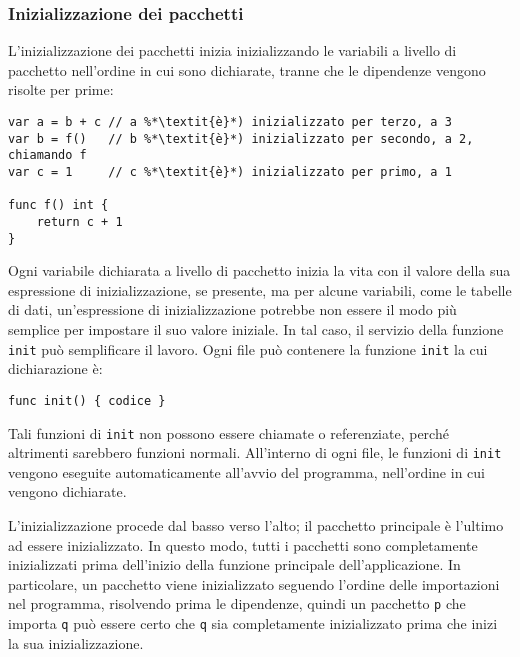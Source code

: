 \documentclass[../../../thesis.tex]{subfiles}
\begin{document}
    \subsubsection{Inizializzazione dei pacchetti}
    L'inizializzazione dei pacchetti inizia inizializzando le variabili a livello di pacchetto nell'ordine in cui sono dichiarate, tranne che le dipendenze vengono risolte per prime:
    \begin{lstlisting}[frame = single, label = {lst:lstlisting1-5-1.1}]
var a = b + c // a %*\textit{è}*) inizializzato per terzo, a 3
var b = f()   // b %*\textit{è}*) inizializzato per secondo, a 2, chiamando f
var c = 1     // c %*\textit{è}*) inizializzato per primo, a 1

func f() int {
    return c + 1
}
    \end{lstlisting}
    Ogni variabile dichiarata a livello di pacchetto inizia la vita con il valore della sua espressione di inizializzazione, se presente, ma per alcune variabili, come le tabelle di dati, un'espressione di inizializzazione potrebbe non essere il modo più semplice per impostare il suo valore iniziale.
    In tal caso, il servizio della funzione \verb"init" può semplificare il lavoro.
    Ogni file può contenere la funzione \verb"init" la cui dichiarazione è:
    \begin{lstlisting}[label = {lst:lstlisting1-5-1.2}]
func init() { codice }
    \end{lstlisting}
    Tali funzioni di \verb"init" non possono essere chiamate o referenziate, perché altrimenti sarebbero funzioni normali.
    All'interno di ogni file, le funzioni di \verb"init" vengono eseguite automaticamente all'avvio del programma, nell'ordine in cui vengono dichiarate.
    \hfill \vspace{12pt}

    L'inizializzazione procede dal basso verso l'alto;
    il pacchetto principale è l'ultimo ad essere inizializzato.
    In questo modo, tutti i pacchetti sono completamente inizializzati prima dell'inizio della funzione principale dell'applicazione.
    In particolare, un pacchetto viene inizializzato seguendo l'ordine delle importazioni nel programma, risolvendo prima le dipendenze, quindi un pacchetto \verb"p" che importa \verb"q" può essere certo che \verb"q" sia completamente inizializzato prima che inizi la sua inizializzazione.
\end{document}
